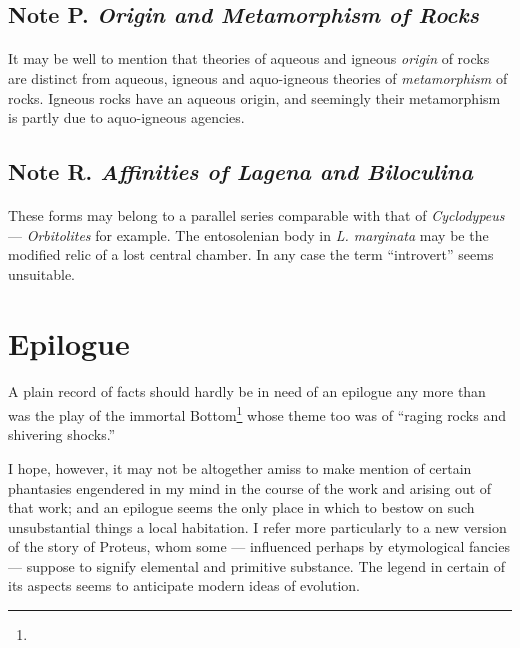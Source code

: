 \documentclass[a4paper, 12pt, oneside]{article}
\begin{document}
\subsection{Note P. \emph{Origin and Metamorphism of Rocks}}
\paragraph{}
It may be well to mention that theories of aqueous and igneous \emph{origin} of rocks are distinct from aqueous, igneous and aquo-igneous theories of \emph{metamorphism} of rocks. Igneous rocks have an aqueous origin, and seemingly their metamorphism is partly due to aquo-igneous agencies.

\subsection{Note R. \emph{Affinities of Lagena and Biloculina}}
\paragraph{}
These forms may belong to a parallel series comparable with that of \emph{Cyclodypeus} --- \emph{Orbitolites} for example. The entosolenian body in \emph{L. marginata} may be the modified relic of a lost central chamber. In any case the term ``introvert'' seems unsuitable.
\clearpage
\section{Epilogue}
\paragraph{}
A plain record of facts should hardly be in need of an epilogue any more than was the play of the immortal Bottom\footnote{} whose theme too was of ``raging rocks and shivering shocks.''

I hope, however, it may not be altogether amiss to make mention of certain phantasies engendered in my mind in the course of the work and arising out of that work; and an epilogue seems the only place in which to bestow on such unsubstantial things a local habitation. I refer more particularly to a new version of the story of Proteus, whom some --- influenced perhaps by etymological fancies --- suppose to signify elemental and primitive substance. The legend in certain of its aspects seems to anticipate modern ideas of evolution.
\end{document}
